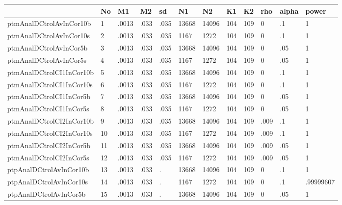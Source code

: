 \begin{tabular}{|l|l|l|l|l|l|l|l|l|l|l|l|}\hline  
 & No  & M1  & M2  & sd  & N1  & N2  & K1  & K2  & rho  & alpha  & power  \\ \hline  
ptmAnalDCtrolAvInCor10b & 1 & .0013 & .033 & .035 & 13668 & 14096 & 104 & 109 & 0 & .1 & 1 \\ \hline 
ptmAnalDCtrolAvInCor10s & 2 & .0013 & .033 & .035 & 1167 & 1272 & 104 & 109 & 0 & .1 & 1 \\ \hline 
ptmAnalDCtrolAvInCor5b & 3 & .0013 & .033 & .035 & 13668 & 14096 & 104 & 109 & 0 & .05 & 1 \\ \hline 
ptmAnalDCtrolAvInCor5s & 4 & .0013 & .033 & .035 & 1167 & 1272 & 104 & 109 & 0 & .05 & 1 \\ \hline 
ptmAnalDCtrolCI1InCor10b & 5 & .0013 & .033 & .035 & 13668 & 14096 & 104 & 109 & 0 & .1 & 1 \\ \hline 
ptmAnalDCtrolCI1InCor10s & 6 & .0013 & .033 & .035 & 1167 & 1272 & 104 & 109 & 0 & .1 & 1 \\ \hline 
ptmAnalDCtrolCI1InCor5b & 7 & .0013 & .033 & .035 & 13668 & 14096 & 104 & 109 & 0 & .05 & 1 \\ \hline 
ptmAnalDCtrolCI1InCor5s & 8 & .0013 & .033 & .035 & 1167 & 1272 & 104 & 109 & 0 & .05 & 1 \\ \hline 
ptmAnalDCtrolCI2InCor10b & 9 & .0013 & .033 & .035 & 13668 & 14096 & 104 & 109 & .009 & .1 & 1 \\ \hline 
ptmAnalDCtrolCI2InCor10s & 10 & .0013 & .033 & .035 & 1167 & 1272 & 104 & 109 & .009 & .1 & 1 \\ \hline 
ptmAnalDCtrolCI2InCor5b & 11 & .0013 & .033 & .035 & 13668 & 14096 & 104 & 109 & .009 & .05 & 1 \\ \hline 
ptmAnalDCtrolCI2InCor5s & 12 & .0013 & .033 & .035 & 1167 & 1272 & 104 & 109 & .009 & .05 & 1 \\ \hline 
ptpAnalDCtrolAvInCor10b & 13 & .0013 & .033 & . & 13668 & 14096 & 104 & 109 & 0 & .1 & 1 \\ \hline 
ptpAnalDCtrolAvInCor10s & 14 & .0013 & .033 & . & 1167 & 1272 & 104 & 109 & 0 & .1 & .99999607 \\ \hline 
ptpAnalDCtrolAvInCor5b & 15 & .0013 & .033 & . & 13668 & 14096 & 104 & 109 & 0 & .05 & 1 \\ \hline 

\end{tabular}
